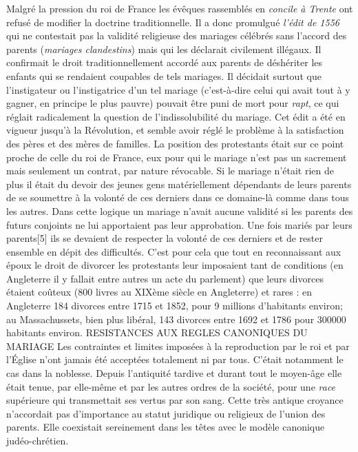  Malgré la pression du roi de France les évêques rassemblés en \emph{concile à Trente} ont refusé de modifier la doctrine traditionnelle. Il a donc promulgué \emph{l'édit de 1556} qui ne contestait pas la validité religieuse des mariages célébrés sans l'accord des parents (\emph{mariages clandestins}) mais qui les déclarait civilement illégaux. Il confirmait le droit traditionnellement accordé aux parents de déshériter les enfants qui se rendaient coupables de tels mariages. Il décidait surtout que l'instigateur ou l'instigatrice d'un tel mariage (c'est-à-dire celui qui avait tout à y gagner, en principe le plus pauvre) pouvait être puni de mort pour \emph{rapt}, ce qui réglait radicalement la question de l'indissolubilité du mariage. Cet édit a été en vigueur jusqu'à la Révolution, et semble avoir réglé le problème à la satisfaction des pères et des mères de familles. 
 La position des protestants était sur ce point proche de celle du roi de France, eux pour qui le mariage n'est pas un sacrement mais seulement un contrat, par nature révocable. Si le mariage n'était rien de plus il était du devoir des jeunes gens matériellement dépendants de leurs parents de se soumettre à la volonté de ces derniers dans ce domaine-là comme dans tous les autres. Dans cette logique un mariage n'avait aucune validité si les parents des futurs conjoints ne lui apportaient pas leur approbation. Une fois mariés par leurs parents[5] ils se devaient de respecter la volonté de ces derniers et de rester ensemble en dépit des difficultés. C'est pour cela que tout en reconnaissant aux époux le droit de divorcer les protestants leur imposaient tant de conditions (en Angleterre il y fallait entre autres un acte du parlement) que leurs divorces étaient coûteux (800 livres au XIXème siècle en Angleterre) et rares : en Angleterre 184 divorces entre 1715 et 1852, pour 9 millions d'habitants environ; au Massachussets, bien plus libéral, 143 divorces entre 1692 et 1786 pour 300000 habitants environ. 
RESISTANCES AUX REGLES CANONIQUES DU MARIAGE
 Les contraintes et limites imposées à la reproduction par le roi et par l'Église n'ont jamais été acceptées totalement ni par tous. C'était notamment le cas dans la noblesse. Depuis l'antiquité tardive et durant tout le moyen-âge elle était tenue, par elle-même et par les autres ordres de la société, pour une \emph{race} supérieure qui transmettait ses vertus par son sang. Cette très antique croyance n'accordait pas d'importance au statut juridique ou religieux de l'union des parents. Elle coexistait sereinement dans les têtes avec le modèle canonique judéo-chrétien. 
